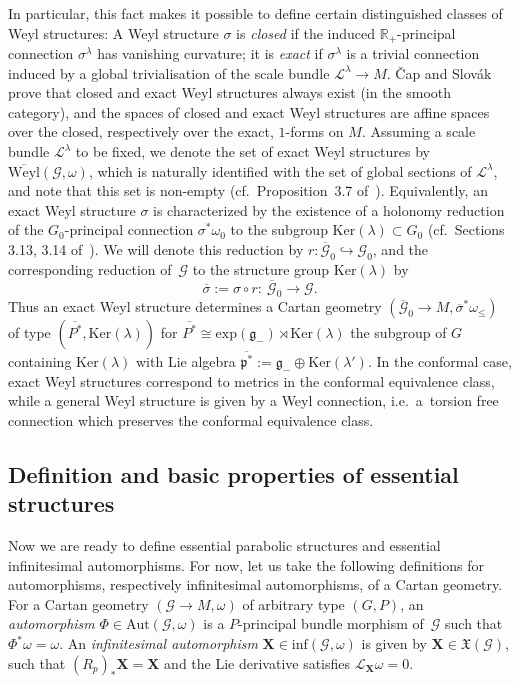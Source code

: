 \documentclass[11pt]{article}
\def\R{\mathbb{R}}
\def\g{\mathfrak{g}}
\def\p{\mathfrak{p}}
\def\Gbdle{\mathcal{G}}
\def\VF{\mathfrak{X}}
\def\dsum{\oplus}
\def\isom{\cong}
\theoremstyle{plain}
\theoremstyle{definition}
\begin{document}
{\sloppy In particular, this fact makes it possible to def\/ine certain distinguished classes of Weyl structures: A Weyl structure $\sigma$ is \emph{closed} if the induced $\R_+$-principal connection $\sigma^{\lambda}$ has vanishing curvature; it is \emph{exact} if $\sigma^{\lambda}$ is a trivial connection induced by a global trivialisation of the scale bundle $\mathcal{L}^{\lambda} \rightarrow M$. \v{C}ap and Slov\'ak prove that closed and exact Weyl structures always exist (in the smooth category), and the spaces of closed and exact Weyl structures are af\/f\/ine spaces over the closed, respectively over the exact, $1$-forms on $M$. Assuming a scale bundle $\mathcal{L}^{\lambda}$ to be f\/ixed, we denote the set of exact Weyl structures by $\overline{\mathrm{Weyl}}(\Gbdle,\omega)$, which is naturally identif\/ied with the set of global sections of $\mathcal{L}^{\lambda}$, and note that this set is non-empty (cf.\ Proposition~3.7 of~\cite{CS03}). Equivalently, an exact Weyl structure $\sigma$ is characterized by the existence of a holonomy reduction of the $G_0$-principal connection $\sigma^*\omega_0$ to the subgroup $\mathrm{Ker}(\lambda) \subset G_0$ (cf.\ Sections 3.13, 3.14 of~\cite{CS03}). We will denote this reduction by $r: \overline{\Gbdle}_0 \hookrightarrow \Gbdle_0$, and the corresponding reduction of~$\Gbdle$ to the structure group $\mathrm{Ker}(\lambda)$ by
\[
\overline{\sigma} := \sigma \circ r: \ \overline{\Gbdle}_0 \rightarrow \Gbdle.
\]
Thus an exact Weyl structure determines a Cartan geometry $(\overline{\Gbdle}_0 \rightarrow M,\overline{\sigma}^*\omega_{\leq})$ of type $(\overline{P^*},\mathrm{Ker}(\lambda))$ for $\overline{P^*} \isom \mathrm{exp}(\g_-) \rtimes \mathrm{Ker}(\lambda)$ the subgroup of $G$ containing $\mathrm{Ker}(\lambda)$ with Lie algebra $\overline{\p^*} := \g_- \dsum \mathrm{Ker}(\lambda')$. In the conformal case, exact Weyl structures correspond to metrics in the conformal equivalence class, while a general Weyl structure is given by a Weyl connection, i.e.\ a~torsion free connection which preserves the conformal equivalence class.

}

\subsection{Def\/inition and basic properties of essential structures}\label{section2.2}

Now we are ready to def\/ine essential parabolic structures and essential inf\/initesimal automorphisms. For now, let us take the following def\/initions for automorphisms, respectively inf\/initesimal automorphisms, of a Cartan geometry. For a Cartan geometry $(\Gbdle \rightarrow M,\omega)$ of arbitrary type $(G,P)$, an \emph{automorphism} $\Phi \in \mathrm{Aut}(\Gbdle,\omega)$ is a $P$-principal bundle morphism of~$\Gbdle$ such that $\Phi^*\omega = \omega$. An \emph{infinitesimal automorphism} $\mathbf{X} \in \mathrm{inf}(\Gbdle,\omega)$ is given by $\mathbf{X} \in \VF(\Gbdle)$, such that $(R_p)_*\mathbf{X} = \mathbf{X}$ and the Lie derivative satisf\/ies $\mathcal{L}_{\mathbf{X}} \omega = 0$.
\end{document}

